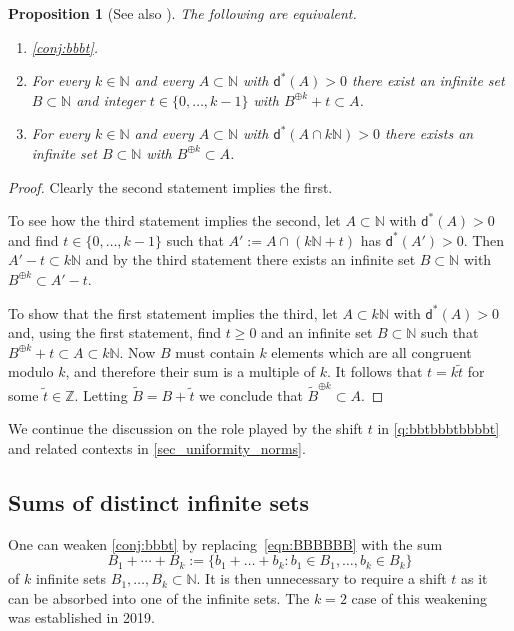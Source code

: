 \documentclass[10pt,dvipsnames]{article}
\newtheorem{proposition}[theorem]{Proposition}
\theoremstyle{definition}
\theoremstyle{plain}
\newcommand{\Z}{\mathbb{Z}}
\newcommand{\N}{\mathbb{N}}
\newcommand{\ubdens}{\mathsf{d}^*}
\begin{document}
\begin{proposition}[See also {\cite[Theorem 11.8]{Hindman79}}]
\label{prop:equivalences-for-shifts}
The following are equivalent.
\begin{enumerate}
\item
\cref{conj:bbbt}.
\item
For every $k\in\N$ and every $A\subset\N$ with $\ubdens(A)>0$ there exist an infinite set $B\subset\N$ and integer $t\in\{0,\dots,k-1\}$ with $B^{\oplus k}+t\subset A$.
\item
For every $k\in\N$ and every $A\subset \N$ with $\ubdens(A\cap k\N)>0$ there exists an infinite set $B\subset \N$ with $B^{\oplus k}\subset A$.
\end{enumerate}
\end{proposition}
\begin{proof}
Clearly the second statement implies the first.

To see how the third statement implies the second, let $A\subset\N$ with $\ubdens(A)>0$ and find $t\in\{0,\dots,k-1\}$ such that $A':=A\cap (k\N+t)$ has $\ubdens(A')>0$.
Then $A'-t\subset k\N$ and by the third statement there exists an infinite set $B\subset\N$ with $B^{\oplus k}\subset A'-t$.

To show that the first statement implies the third, let $A\subset k\N$ with $\ubdens(A)>0$ and, using the first statement, find $t\geq0$ and an infinite set $B\subset\N$ such that $B^{\oplus k}+t\subset A\subset k\N$.
Now $B$ must contain $k$ elements which are all congruent modulo $k$, and therefore their sum is a multiple of $k$.
It follows that $t=k\tilde{t}$ for some $\tilde{t}\in\Z$.
Letting $\tilde{B}=B+\tilde{t}$ we conclude that $\tilde{B}^{\oplus k}\subset A$.
\end{proof}
We continue the discussion on the role played by the shift  $t$ in \cref{q:bbtbbbtbbbbt} and related contexts in \cref{sec_uniformity_norms}.


\subsection{Sums of distinct infinite sets}

One can weaken \cref{conj:bbbt} by replacing~\eqref{eqn:BBBBBB} with the sum
\[
B_1+\cdots+B_k := \bigl\{ b_1+\dots + b_k:b_1\in B_1,\dots, b_k\in B_k \}
\]
of $k$ infinite sets $B_1,\dots,B_k \subset \N$. 
It is then unnecessary to require a shift $t$ as it can be absorbed into one of the infinite sets. The $k=2$ case of this weakening was established in 2019.
\end{document}
